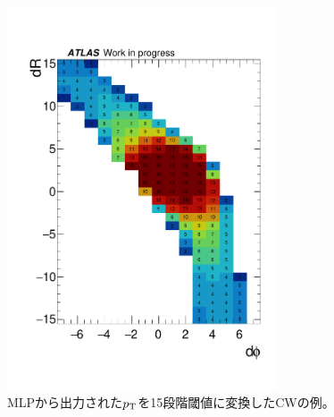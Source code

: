 

\begin{figure}[tb]
  \centering
  \hspace*{-1cm}
  \includegraphics[clip, width=8cm]{fig/4/data_phi0_roi33_15thr_re.pdf}
  \caption{MLPから出力された$p_{\rm{T}}$を15段階閾値に変換したCWの例。}
    \label{CW}
\end{figure}